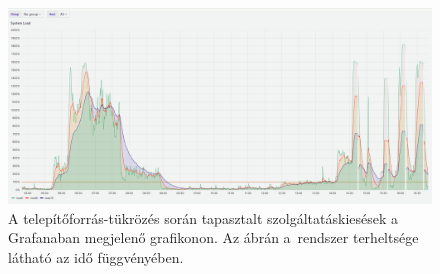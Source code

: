 \begin{figure}[h!t]
	\centering
	\includegraphics[width=15cm]{figures/reboot-grafana-invert.jpg}
	\caption{A telepítőforrás-tükrözés során tapasztalt szolgáltatáskiesések a Grafanaban megjelenő grafikonon. Az ábrán a~rendszer terheltsége látható az idő függvényében.}
	\label{fig:reboot-grafana}
\end{figure}
